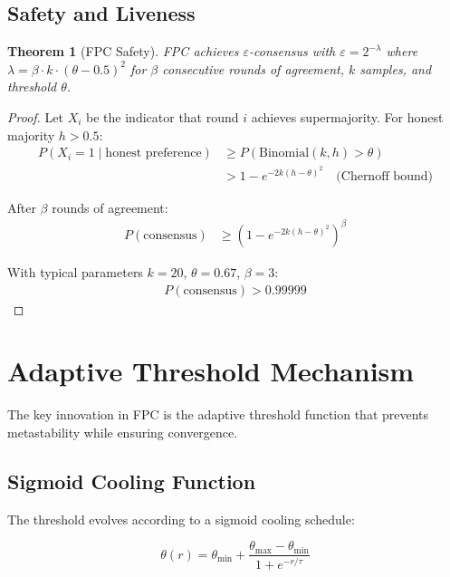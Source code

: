 \documentclass[11pt,a4paper]{article}
\newtheorem{theorem}{Theorem}
\begin{document}
\subsection{Safety and Liveness}

\begin{theorem}[FPC Safety]
\label{thm:safety}
FPC achieves $\varepsilon$-consensus with $\varepsilon = 2^{-\lambda}$ where $\lambda = \beta \cdot k \cdot (\theta - 0.5)^2$ for $\beta$ consecutive rounds of agreement, $k$ samples, and threshold $\theta$.
\end{theorem}

\begin{proof}
Let $X_i$ be the indicator that round $i$ achieves supermajority. For honest majority $h > 0.5$:
\begin{align}
P(X_i = 1 \mid \text{honest preference}) &\geq P(\text{Binomial}(k, h) > \theta) \\
&> 1 - e^{-2k(h-\theta)^2} \quad \text{(Chernoff bound)}
\end{align}

After $\beta$ rounds of agreement:
\begin{align}
P(\text{consensus}) &\geq \left(1 - e^{-2k(h-\theta)^2}\right)^\beta
\end{align}

With typical parameters $k = 20$, $\theta = 0.67$, $\beta = 3$:
\begin{align}
P(\text{consensus}) > 0.99999
\end{align}
\end{proof}

\section{Adaptive Threshold Mechanism}
\label{sec:adaptive}

The key innovation in FPC is the adaptive threshold function that prevents metastability while ensuring convergence.

\subsection{Sigmoid Cooling Function}

The threshold evolves according to a sigmoid cooling schedule:

\begin{equation}
\theta(r) = \theta_{\min} + \frac{\theta_{\max} - \theta_{\min}}{1 + e^{-r/\tau}}
\label{eq:sigmoid}
\end{equation}
\end{document}
